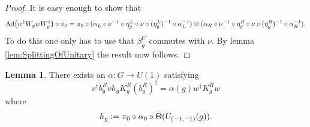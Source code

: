 \documentclass[12pt,a4paper,twoside]{article}
\newcommand{\defeq}{\vcentcolon=}
\let\originalleft\left
\let\originalright\right
\renewcommand{\left}{\mathopen{}\mathclose\bgroup\originalleft}
\renewcommand{\right}{\aftergroup\egroup\originalright}
\newcommand{\Ad}[1]{\textrm{Ad}\left(#1\right)}
\theoremstyle{definition}
\newtheorem{lemma}[theorem]{Lemma}
\numberwithin{equation}{section}
\begin{document}
\begin{proof}
	It is easy enough to show that
	\begin{equation}
		\Ad{w^\dagger W_g w W_g^\dagger}\circ\pi_0=\pi_0\circ (\alpha_L\circ\nu^{-1}\circ\eta_g^L\circ\nu\circ(\eta_g^L)^{-1}\circ\alpha_L^{-1})\otimes(\alpha_R\circ\nu^{-1}\circ\eta_g^R\circ\nu\circ(\eta_g^R)^{-1}\circ\alpha_R^{-1}).
	\end{equation}
	To do this one only has to use that $\beta_g^U$ commutes with $\nu$. By lemma \ref{lem:SplittingOfUnitary} the result now follows.
\end{proof}
\begin{lemma}\label{lem:DefinitionAlpha}
	There exists an $\alpha:G\rightarrow U(1)$ satisfying
	\begin{equation}\label{eq:DefinitionOfTheH_1Index}
		v^\dagger b_g^R vh_g K_g^R (b_g^R)^\dagger=\alpha(g)w^\dagger K_g^R w
	\end{equation}
	where
	\begin{equation}
		h_g\defeq\pi_0\circ\alpha_0\circ\Theta(U_{(-1,-1)}(g)).
	\end{equation}
\end{lemma}
\end{document}
